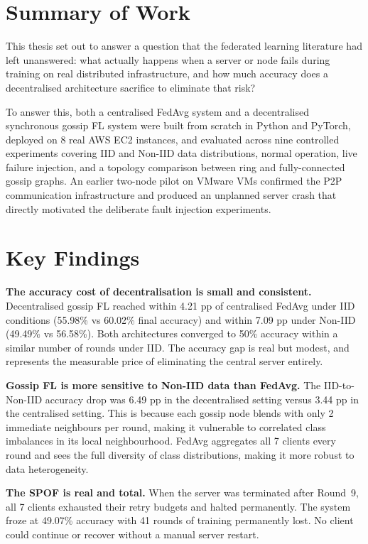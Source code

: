 \documentclass[12pt]{report}
\begin{document}
\section{Summary of Work}

This thesis set out to answer a question that the federated learning literature
had left unanswered: what actually happens when a server or node fails during
training on real distributed infrastructure, and how much accuracy does a
decentralised architecture sacrifice to eliminate that risk?

To answer this, both a centralised FedAvg system and a decentralised synchronous
gossip FL system were built from scratch in Python and PyTorch, deployed on
8 real AWS EC2 instances, and evaluated across nine controlled experiments covering
IID and Non-IID data distributions, normal operation, live failure injection, and
a topology comparison between ring and fully-connected gossip graphs.
An earlier two-node pilot on VMware VMs confirmed the P2P communication
infrastructure and produced an unplanned server crash that directly motivated the
deliberate fault injection experiments.

\section{Key Findings}

\textbf{The accuracy cost of decentralisation is small and consistent.}
Decentralised gossip FL reached within 4.21 pp of centralised FedAvg under IID
conditions (55.98\% vs 60.02\% final accuracy) and within 7.09 pp under Non-IID
(49.49\% vs 56.58\%). Both architectures converged to 50\% accuracy within a
similar number of rounds under IID. The accuracy gap is real but modest, and
represents the measurable price of eliminating the central server entirely.

\textbf{Gossip FL is more sensitive to Non-IID data than FedAvg.}
The IID-to-Non-IID accuracy drop was 6.49 pp in the decentralised setting versus
3.44 pp in the centralised setting. This is because each gossip node blends with
only 2 immediate neighbours per round, making it vulnerable to correlated class
imbalances in its local neighbourhood. FedAvg aggregates all 7 clients every
round and sees the full diversity of class distributions, making it more robust
to data heterogeneity.

\textbf{The SPOF is real and total.}
When the server was terminated after Round~9, all 7 clients exhausted their
retry budgets and halted permanently. The system froze at 49.07\% accuracy
with 41 rounds of training permanently lost. No client could continue or
recover without a manual server restart.
\end{document}
